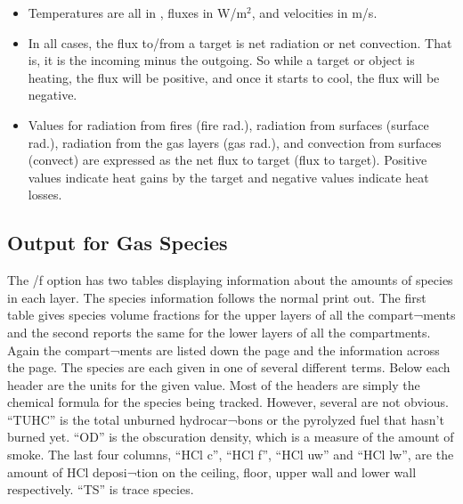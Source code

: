\begin{itemize}
\item Temperatures are all in \degc, fluxes in W/m$^2$, and velocities in m/s.
\item In all cases, the flux to/from a target is net radiation or net convection. That is, it is the incoming minus the outgoing. So while a target or object is heating, the flux will be positive, and once it starts to cool, the flux will be negative.
\item Values for radiation from fires (fire rad.), radiation from surfaces (surface rad.), radiation from the gas layers (gas rad.), and convection from surfaces (convect) are expressed as the net flux to target (flux to target). Positive values indicate heat gains by the target and negative values indicate heat losses.
\end{itemize}

\subsection{Output for Gas Species}

The /f option has two tables displaying information about the amounts of species in each layer. The species information follows the normal print out.  The first table gives species volume fractions for the upper layers of all the compart¬ments and the second reports the same for the lower layers of all the compartments.  Again the compart¬ments are listed down the page and the information across the page.  The species are each given in one of several different terms.  Below each header are the units for the given value.  Most of the headers are simply the chemical formula for the species being tracked.  However, several are not obvious.  ``TUHC'' is the total unburned hydrocar¬bons or the pyrolyzed fuel that hasn't burned yet.  ``OD'' is the obscuration density, which is a measure of the amount of smoke.  The last four columns, ``HCl c'', ``HCl f'', ``HCl uw'' and ``HCl lw'', are the amount of HCl deposi¬tion on the ceiling, floor, upper wall and lower wall respectively. ``TS'' is trace species.


